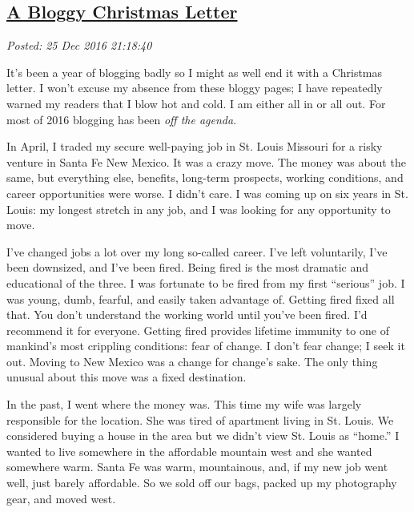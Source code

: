 %

\subsection*{\href{http://analyzethedatanotthedrivel.org/2016/12/25/a-bloggy-christmas-letter/}{A Bloggy Christmas Letter}}


\noindent\emph{Posted: 25 Dec 2016 21:18:40}
\vspace{6pt}

It's been a year of blogging badly so I might as well end it with a
Christmas letter. I won't excuse my absence from these bloggy pages; I
have repeatedly warned my readers that I blow hot and cold. I am either
all in or all out. For most of 2016 blogging has been \emph{off the
agenda}.

In April, I traded my secure well-paying job in St. Louis Missouri for a
risky venture in Santa Fe New Mexico. It was a crazy move. The money was
about the same, but everything else, benefits, long-term prospects,
working conditions, and career opportunities were worse. I didn't care.
I was coming up on six years in St. Louis: my longest stretch in any
job, and I was looking for any opportunity to move.

I've changed jobs a lot over my long so-called career. I've left
voluntarily, I've been downsized, and I've been fired. Being fired is
the most dramatic and educational of the three. I was fortunate to be
fired from my first ``serious'' job. I was young, dumb, fearful, and
easily taken advantage of. Getting fired fixed all that. You don't
understand the working world until you've been fired. I'd recommend it
for everyone. Getting fired provides lifetime immunity to one of
mankind's most crippling conditions: fear of change. I don't fear
change; I seek it out. Moving to New Mexico was a change for change's
sake. The only thing unusual about this move was a fixed destination.

In the past, I went where the money was. This time my wife was largely
responsible for the location. She was tired of apartment living in St.
Louis. We considered buying a house in the area but we didn't view St.
Louis as ``home.'' I wanted to live somewhere in the affordable mountain
west and she wanted somewhere warm. Santa Fe was warm, mountainous, and,
if my new job went well, just barely affordable. So we sold off our
bags, packed up my photography gear, and moved west.

